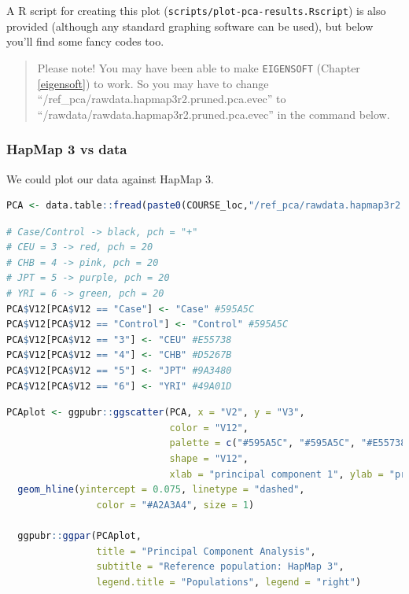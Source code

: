 \documentclass[
]{book}
\newcommand{\passthrough}[1]{#1}
\begin{document}
A R script for creating this plot (\passthrough{\lstinline!scripts/plot-pca-results.Rscript!}) is also provided (although any standard graphing software can be used), but below you'll find some fancy codes too.

\begin{quote}
Please note! You may have been able to make \passthrough{\lstinline!EIGENSOFT!} (Chapter \ref{eigensoft}) to work. So you may have to change ``/ref\_pca/rawdata.hapmap3r2.pruned.pca.evec'' to ``/rawdata/rawdata.hapmap3r2.pruned.pca.evec'' in the command below.
\end{quote}

\hypertarget{hapmap-3-vs-data-1}{%
\subsubsection{HapMap 3 vs data}\label{hapmap-3-vs-data-1}}

We could plot our data against HapMap 3.

\begin{lstlisting}[language=R]
PCA <- data.table::fread(paste0(COURSE_loc,"/ref_pca/rawdata.hapmap3r2.pruned.pca.evec"), header = FALSE, skip = 1)
\end{lstlisting}

\begin{lstlisting}[language=R]
# Case/Control -> black, pch = "+"
# CEU = 3 -> red, pch = 20
# CHB = 4 -> pink, pch = 20
# JPT = 5 -> purple, pch = 20
# YRI = 6 -> green, pch = 20
PCA$V12[PCA$V12 == "Case"] <- "Case" #595A5C
PCA$V12[PCA$V12 == "Control"] <- "Control" #595A5C
PCA$V12[PCA$V12 == "3"] <- "CEU" #E55738
PCA$V12[PCA$V12 == "4"] <- "CHB" #D5267B
PCA$V12[PCA$V12 == "5"] <- "JPT" #9A3480
PCA$V12[PCA$V12 == "6"] <- "YRI" #49A01D
\end{lstlisting}

\begin{lstlisting}[language=R]
PCAplot <- ggpubr::ggscatter(PCA, x = "V2", y = "V3",
                             color = "V12",
                             palette = c("#595A5C", "#595A5C", "#E55738", "#D5267B", "#9A3480", "#49A01D"),
                             shape = "V12",
                             xlab = "principal component 1", ylab = "principal component 2") +
  geom_hline(yintercept = 0.075, linetype = "dashed",
                color = "#A2A3A4", size = 1)

  ggpubr::ggpar(PCAplot,
                title = "Principal Component Analysis",
                subtitle = "Reference population: HapMap 3",
                legend.title = "Populations", legend = "right")
\end{lstlisting}
\end{document}
